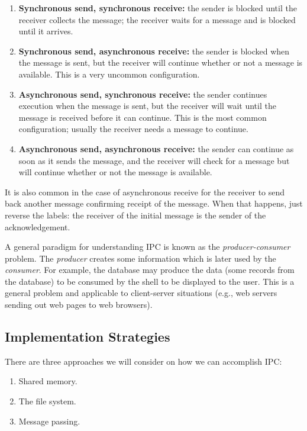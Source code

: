 \begin{enumerate}
	\item \textbf{Synchronous send, synchronous receive:} the sender is blocked until the receiver collects the message; the receiver waits for a message and is blocked until it arrives. 
	\item \textbf{Synchronous send, asynchronous receive:} the sender is blocked when the message is sent, but the receiver will continue whether or not a message is available. This is a very uncommon configuration.
	\item \textbf{Asynchronous send, synchronous receive:} the sender continues execution when the message is sent, but the receiver will wait until the message is received before it can continue. This is the most common configuration; usually the receiver needs a message to continue.
	\item \textbf{Asynchronous send, asynchronous receive:} the sender can continue as soon as it sends the message, and the receiver will check for a message but will continue whether or not the message is available.
\end{enumerate}

It is also common in the case of asynchronous receive for the receiver to send back another message confirming receipt of the message. When that happens, just reverse the labels: the receiver of the initial message is the sender of the acknowledgement.

A general paradigm for understanding IPC is known as the \textit{producer-consumer} problem. The \textit{producer} creates some information which is later used by the \textit{consumer}. For example, the database may produce the data (some records from the database) to be consumed by the shell to be displayed to the user. This is a general problem and applicable to client-server situations (e.g., web servers sending out web pages to web browsers).

\subsection*{Implementation Strategies}

There are three approaches we will consider on how we can accomplish IPC:
\begin{enumerate}
	\item Shared memory.
	\item The file system.
	\item Message passing.
\end{enumerate}


